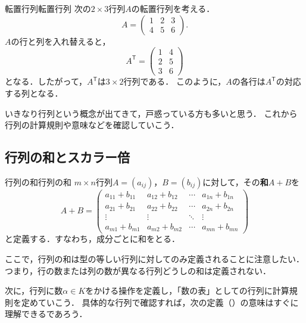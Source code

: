 \begin{example}{転置行列}{転置行列}
  次の$2 \times 3$行列$A$の転置行列を考える．
  \[
    A =
    \begin{pmatrix}
      1 & 2 & 3 \\
      4 & 5 & 6
    \end{pmatrix}.
  \]
  $A$の行と列を入れ替えると，
  \[
    A^\mathsf{T}
    =
    \begin{pmatrix}
      1 & 4 \\
      2 & 5 \\
      3 & 6
    \end{pmatrix}
  \]
  となる．したがって，$A^\mathsf{T}$は$3 \times 2$行列である．
  このように，$A$の各行は$A^\mathsf{T}$の対応する列となる．
\end{example}

いきなり行列という概念が出てきて，戸惑っている方も多いと思う．
これから行列の計算規則や意味などを確認していこう．

\subsection{行列の和とスカラー倍}

\begin{definition}{行列の和}{行列の和}
  $m \times n$行列$A = (a_{ij})$，$B = (b_{ij})$に対して，その\textbf{和}$A + B$を
  \[
    A + B =
    \begin{pmatrix}
      a_{11} + b_{11} & a_{12} + b_{12} & \cdots & a_{1n} + b_{1n} \\
      a_{21} + b_{21} & a_{22} + b_{22} & \cdots & a_{2n} + b_{2n} \\
      \vdots & \vdots & \ddots & \vdots \\
      a_{m1} + b_{m1} & a_{m2} + b_{m2} & \cdots & a_{mn} + b_{mn}
    \end{pmatrix}
  \]
  と定義する．すなわち，成分ごとに和をとる．
\end{definition}

ここで，行列の和は型の等しい行列に対してのみ定義されることに注意したい．
つまり，行の数または列の数が異なる行列どうしの和は定義されない．

次に，行列に数$\alpha \in K$をかける操作を定義し，「数の表」としての行列に計算規則を定めていこう．
具体的な行列で確認すれば，次の定義（）の意味はすぐに理解できるであろう．

